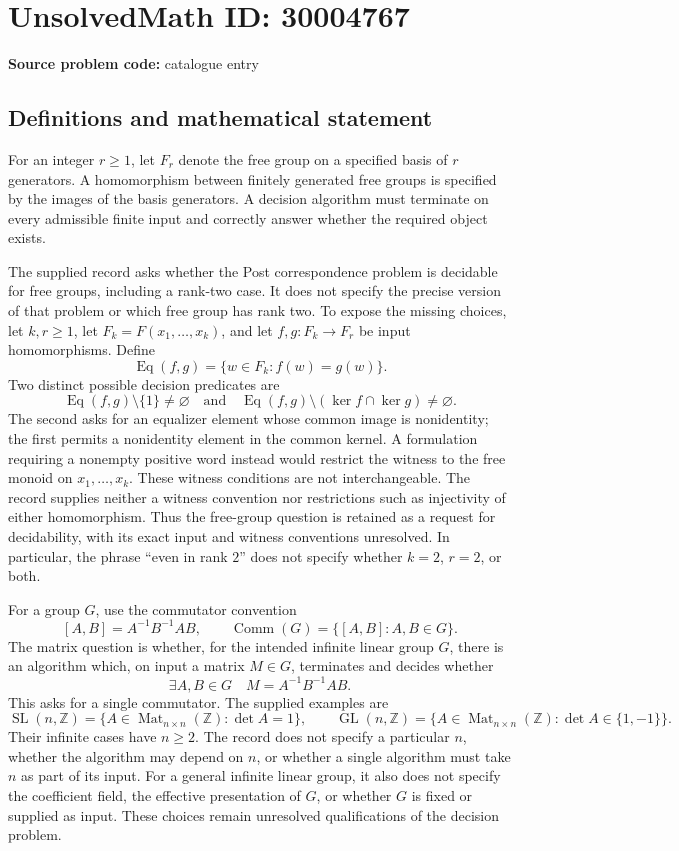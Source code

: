 \documentclass[11pt]{article}
\newcommand{\Z}{\mathbb{Z}}
\begin{document}
\section*{UnsolvedMath ID: 30004767}
\textbf{Source problem code:} catalogue entry
\subsection{Definitions and mathematical statement}
For an integer \(r\geq 1\), let \(F_r\) denote the free group on a specified basis of \(r\) generators. A homomorphism between finitely generated free groups is specified by the images of the basis generators. A decision algorithm must terminate on every admissible finite input and correctly answer whether the required object exists.

The supplied record asks whether the Post correspondence problem is decidable for free groups, including a rank-two case. It does not specify the precise version of that problem or which free group has rank two. To expose the missing choices, let \(k,r\geq 1\), let \(F_k=F(x_1,\ldots,x_k)\), and let \(f,g:F_k\to F_r\) be input homomorphisms. Define
\[
\operatorname{Eq}(f,g)=\{w\in F_k:f(w)=g(w)\}.
\]
Two distinct possible decision predicates are
\[
\operatorname{Eq}(f,g)\setminus\{1\}\neq\varnothing
\quad\text{and}\quad
\operatorname{Eq}(f,g)\setminus(\ker f\cap\ker g)\neq\varnothing.
\]
The second asks for an equalizer element whose common image is nonidentity; the first permits a nonidentity element in the common kernel. A formulation requiring a nonempty positive word instead would restrict the witness to the free monoid on \(x_1,\ldots,x_k\). These witness conditions are not interchangeable. The record supplies neither a witness convention nor restrictions such as injectivity of either homomorphism. Thus the free-group question is retained as a request for decidability, with its exact input and witness conventions unresolved. In particular, the phrase ``even in rank \(2\)'' does not specify whether \(k=2\), \(r=2\), or both.

For a group \(G\), use the commutator convention
\[
[A,B]=A^{-1}B^{-1}AB,
\qquad
\operatorname{Comm}(G)=\{[A,B]:A,B\in G\}.
\]
The matrix question is whether, for the intended infinite linear group \(G\), there is an algorithm which, on input a matrix \(M\in G\), terminates and decides whether
\[
\exists A,B\in G\quad M=A^{-1}B^{-1}AB.
\]
This asks for a single commutator. The supplied examples are
\[
\operatorname{SL}(n,\Z)=\{A\in\operatorname{Mat}_{n\times n}(\Z):\det A=1\},
\qquad
\operatorname{GL}(n,\Z)=\{A\in\operatorname{Mat}_{n\times n}(\Z):\det A\in\{1,-1\}\}.
\]
Their infinite cases have \(n\geq 2\). The record does not specify a particular \(n\), whether the algorithm may depend on \(n\), or whether a single algorithm must take \(n\) as part of its input. For a general infinite linear group, it also does not specify the coefficient field, the effective presentation of \(G\), or whether \(G\) is fixed or supplied as input. These choices remain unresolved qualifications of the decision problem.
\end{document}
